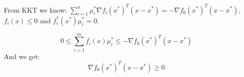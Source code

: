 From KKT we know: $\sum\limits_{i=1}^n \mu_i^* \nabla f_i(x^*)^T(x-x^*) = - \nabla f_0(x^*)^T(x-x^*)$,  $f_i(x) \leq 0$ and $f_i^*(x^*)\mu_i^* = 0$.

\begin{equation*}
    0 \leq \sum\limits_{i=1}^{m}f_i(x)\mu_i^* \leq -\nabla f_0(x^*)^T(x-x^*)
\end{equation*}
And we get:
\begin{equation*}
    \nabla f_0(x^*)^T(x-x^*) \geq 0 
\end{equation*}



